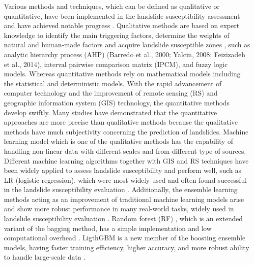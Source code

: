\documentclass[a4paper,fleqn]{cas-sc}
\begin{document}
Various methods and techniques, which can be defined as qualitative or quantitative, have been implemented in the landslide susceptibility assessment and have achieved notable progress \citep{Fang2020IJoGIS,Guzzetti_1999_Geomorphology,Bui2020Catena}. 
Qualitative methods are based on expert knowledge to identify the main triggering factors, determine the weights of natural and human-made factors and acquire landslide susceptible zones \citep{Aditian2018Geomorphology}, such as analytic hierarchy process (AHP) (Barredo et al., 2000; Yalcin, 2008; Feizizadeh et al., 2014)\citep{Barredo2000IJoAEOaG,Yalcin2008Catena}, interval pairwise comparison matrix (IPCM)\citep{Ghorbanzadeh2019RemoteSensing}, and fuzzy logic models\citep{Aksoy2012Computers&Geosciences,Anbalagan2015GeoenvironmentalDisasters,Shahabi2015EnvironmentalEarthSciences,Roy2019RemoteSensingApplicationsSocietyandEnvironment}. 
Whereas quantitative methods rely on mathematical models including the statistical and deterministic models\citep{Abuzied2016JoMS, Reichenbach2018ER,Fang2020IJoGIS}. 
With the rapid advancement of computer technology and the improvement of remote sensing (RS) and geographic information system (GIS) technology, the quantitative methods develop swiftly. 
Many studies have demonstrated that the quantitative approaches are more precise than qualitative methods because the qualitative methods have much subjectivity concerning the prediction of landslides\citep{Aditian2018Geomorphology, Bui2020Catena}. 
Machine learning model which is one of the qualitative methods has the capability of handling non-linear data with different scales and from different type of sources\citep{Bui2020Catena}. 
Different machine learning algorithms together with GIS and RS techniques have been widely applied to assess landslide susceptibility and perform well, such as LR (logistic regression), which were most widely used and often found successful in the landslide susceptibility evaluation \citep{Ayalew2005Geomorphology,Eeckhaut2006Geomorphology,Bai2010Geomorphology,Akgun2012Landslides,Sevgen2019S,Dag2020EES}. 
Additionally, the ensemble learning methods acting as an improvement of traditional machine learning models arise and show more robust performance in many real-world tasks, widely used in landslide susceptibility evaluation \citep{Althuwaynee2014Landslides,Napoli2020Landslides,Hong2020SoTTE,Saha2021SoTTE}. 
Random forest (RF) \citep{Breiman2001}, which is an extended variant of the bagging method, has a simple implementation and low computational overhead \cite{Youssef2015Landslides, Kim2017GI}. 
LigthGBM is a new member of the boosting ensemble models, having faster training efficiency, higher accuracy, and more robust ability to handle large-scale data \citep{Song2018}. 
\end{document}

